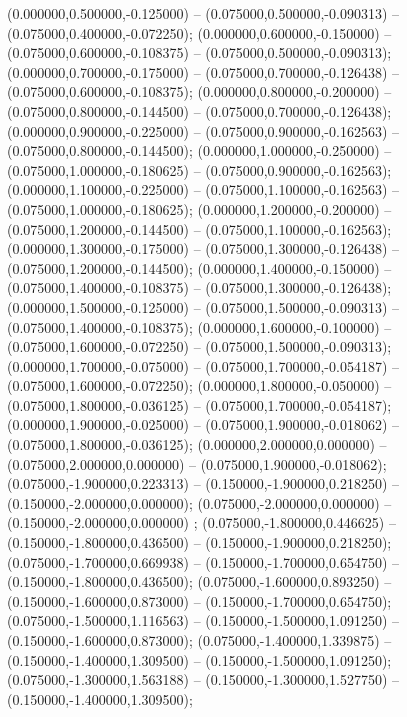  (0.000000,0.500000,-0.125000) -- (0.075000,0.500000,-0.090313) -- (0.075000,0.400000,-0.072250);
 (0.000000,0.600000,-0.150000) -- (0.075000,0.600000,-0.108375) -- (0.075000,0.500000,-0.090313);
 (0.000000,0.700000,-0.175000) -- (0.075000,0.700000,-0.126438) -- (0.075000,0.600000,-0.108375);
 (0.000000,0.800000,-0.200000) -- (0.075000,0.800000,-0.144500) -- (0.075000,0.700000,-0.126438);
 (0.000000,0.900000,-0.225000) -- (0.075000,0.900000,-0.162563) -- (0.075000,0.800000,-0.144500);
 (0.000000,1.000000,-0.250000) -- (0.075000,1.000000,-0.180625) -- (0.075000,0.900000,-0.162563);
 (0.000000,1.100000,-0.225000) -- (0.075000,1.100000,-0.162563) -- (0.075000,1.000000,-0.180625);
 (0.000000,1.200000,-0.200000) -- (0.075000,1.200000,-0.144500) -- (0.075000,1.100000,-0.162563);
 (0.000000,1.300000,-0.175000) -- (0.075000,1.300000,-0.126438) -- (0.075000,1.200000,-0.144500);
 (0.000000,1.400000,-0.150000) -- (0.075000,1.400000,-0.108375) -- (0.075000,1.300000,-0.126438);
 (0.000000,1.500000,-0.125000) -- (0.075000,1.500000,-0.090313) -- (0.075000,1.400000,-0.108375);
 (0.000000,1.600000,-0.100000) -- (0.075000,1.600000,-0.072250) -- (0.075000,1.500000,-0.090313);
 (0.000000,1.700000,-0.075000) -- (0.075000,1.700000,-0.054187) -- (0.075000,1.600000,-0.072250);
 (0.000000,1.800000,-0.050000) -- (0.075000,1.800000,-0.036125) -- (0.075000,1.700000,-0.054187);
 (0.000000,1.900000,-0.025000) -- (0.075000,1.900000,-0.018062) -- (0.075000,1.800000,-0.036125);
 (0.000000,2.000000,0.000000) -- (0.075000,2.000000,0.000000) -- (0.075000,1.900000,-0.018062);
 (0.075000,-1.900000,0.223313) -- (0.150000,-1.900000,0.218250) -- (0.150000,-2.000000,0.000000);
 (0.075000,-2.000000,0.000000) -- (0.150000,-2.000000,0.000000) ;
 (0.075000,-1.800000,0.446625) -- (0.150000,-1.800000,0.436500) -- (0.150000,-1.900000,0.218250);
 (0.075000,-1.700000,0.669938) -- (0.150000,-1.700000,0.654750) -- (0.150000,-1.800000,0.436500);
 (0.075000,-1.600000,0.893250) -- (0.150000,-1.600000,0.873000) -- (0.150000,-1.700000,0.654750);
 (0.075000,-1.500000,1.116563) -- (0.150000,-1.500000,1.091250) -- (0.150000,-1.600000,0.873000);
 (0.075000,-1.400000,1.339875) -- (0.150000,-1.400000,1.309500) -- (0.150000,-1.500000,1.091250);
 (0.075000,-1.300000,1.563188) -- (0.150000,-1.300000,1.527750) -- (0.150000,-1.400000,1.309500);
